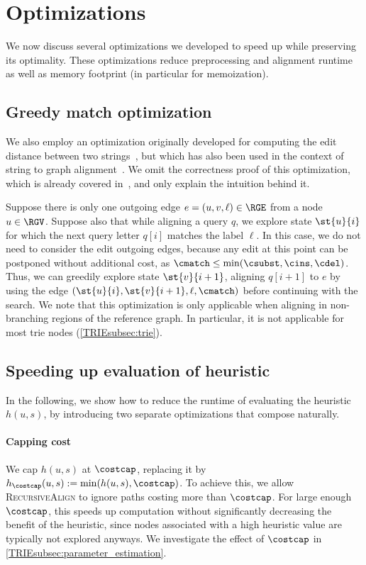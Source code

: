 \section{Optimizations} \label{TRIEsec:optimizations}

We now discuss several optimizations we developed to speed up \astarix while
preserving its optimality. These optimizations reduce preprocessing and
alignment runtime as well as memory footprint (in particular for memoization).

\subsection{Greedy match optimization} \label{TRIEsubsec:greedy}
We also employ an optimization originally developed for computing the edit
distance between two strings~\cite{sellers_algorithm_1974,allison_lazy_1992}, but
which has also been used in the context of string to graph
alignment~\cite{dox2018efficient}. We omit the correctness proof of this
optimization, which is already covered
in~\cite{sellers_algorithm_1974}, and only explain the intuition behind it.

Suppose there is only one outgoing edge $e = (u, v, \ell) \in \RGE$ from a node
$u \in \RGV$. Suppose also that while aligning a query $q$, we explore state
$\st{u}{i}$ for which the next query letter $q[i]$ matches the label $\ell$. In
this case, we do not need to consider the edit outgoing edges, because
any edit at this point can be postponed without additional cost, as $\cmatch
\leq \min(\csubst, \cins, \cdel)$. Thus, we can greedily explore state
$\st{v}{i+1}$, aligning $q[i+1]$ to $e$ by using the edge $(\st{u}{i},
\st{v}{i+1}, \ell, \cmatch)$ before continuing with the \A search.
We note that this optimization is only applicable when aligning in non-branching
regions of the reference graph. In particular, it is not applicable for most
trie nodes (\cref{TRIEsubsec:trie}).

\subsection{Speeding up evaluation of heuristic} \label{TRIEsubsec:speedup-heuristic}
In the following, we show how to reduce the runtime of evaluating the heuristic
$h(u,s)$, by introducing two separate optimizations that compose naturally.

\paragraph{Capping cost} We cap $h(u,s)$ at $\costcap$, replacing it by
$h_{\costcap}(u,s):=\min(h(u,s),\costcap)$. To achieve this, we allow
\textsc{RecursiveAlign} to ignore paths costing more than $\costcap$.
%
For large enough $\costcap$, this speeds up computation without significantly
decreasing the benefit of the heuristic, since nodes associated with a high
heuristic value are typically not explored anyways. We investigate the effect of
$\costcap$ in \cref{TRIEsubsec:parameter_estimation}.

